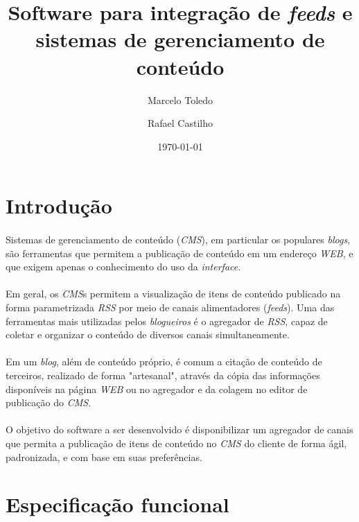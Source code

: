 \documentclass[a4paper,12pt]{article}
\def\cms{\emph{CMS}}
\def\rss{\emph{RSS}}
\begin{document}
\title{Software para integração de \emph{feeds} e sistemas de gerenciamento de conteúdo}
\author{Marcelo Toledo \and Rafael Castilho}
\date{\today}

\maketitle

\newpage
\section{Introdução}

\paragraph{}
Sistemas de gerenciamento de conteúdo (\cms{}), em particular os populares
\emph{blogs}, são ferramentas que permitem a publicação de conteúdo em um
endereço \emph{WEB}, e que exigem apenas o conhecimento do uso da
\emph{interface}.

\paragraph{}
Em geral, os \cms{}s permitem a visualização de itens de conteúdo publicado na
forma parametrizada \rss{} por meio de canais alimentadores (\emph{feeds}). Uma
das ferramentas mais utilizadas pelos \emph{blogueiros} é o agregador de
\rss{}, capaz de coletar e organizar o conteúdo de diversos canais
simultaneamente.

\paragraph{}
Em um \emph{blog}, além de conteúdo próprio, é comum a citação de conteúdo de
terceiros, realizado de forma "artesanal", através da cópia das informações
disponíveis na página \emph{WEB} ou no agregador e da colagem no editor de
publicação do \cms{}.

\paragraph{}
O objetivo do software a ser desenvolvido é disponibilizar um agregador de
canais que permita a publicação de itens de conteúdo no \cms{} do cliente de
forma ágil, padronizada, e com base em suas preferências.

\section{Especificação funcional}
\end{document}
